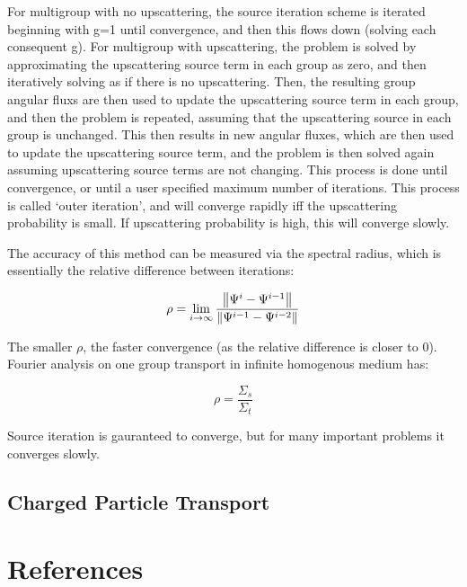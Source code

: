 For multigroup with no upscattering, the source iteration scheme is iterated beginning with g=1 until convergence, and then this flows down (solving each consequent g). For multigroup with upscattering, the problem is solved by approximating the upscattering source term in each group as zero, and then iteratively solving as if there is no upscattering. Then, the resulting group angular fluxs are then used to update the upscattering source term in each group, and then the problem is repeated, assuming that the upscattering source in each group is unchanged. This then results in new angular fluxes, which are then used to update the upscattering source term, and the problem is then solved again assuming upscattering source terms are not changing. This process is done until convergence, or until a user specified maximum number of iterations. This process is called `outer iteration', and will converge rapidly iff the upscattering probability is small. If upscattering probability is high, this will converge slowly. 

The accuracy of this method can be measured via the spectral radius, which is essentially the relative difference between iterations:

\begin{equation}
    \rho = \lim_{i\rightarrow\infty}\frac{\left\lVert\Psi^i - \Psi^{i-1}\right\rVert}{\left\lVert\Psi^{i-1} - \Psi^{i-2}\right\rVert}
\end{equation}

The smaller $\rho$, the faster convergence (as the relative difference is closer to 0). Fourier analysis on one group transport in infinite homogenous medium has:

\begin{equation}
    \rho = \frac{\Sigma_s}{\Sigma_t}
\end{equation}

Source iteration is gauranteed to converge, but for many important problems it converges slowly. 

\subsection{Charged Particle Transport}

\clearpage
{}
\section*{References}
\printbibliography[heading=none]

